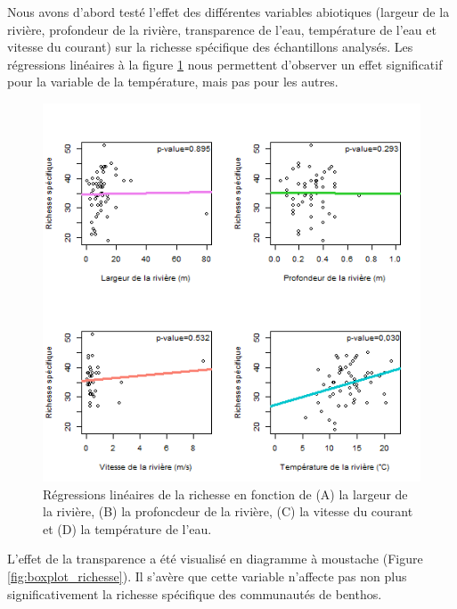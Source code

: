 \documentclass[9pt,twocolumn,twoside,]{pnas-new}
\begin{document}
Nous avons d'abord testé l'effet des différentes variables abiotiques
(largeur de la rivière, profondeur de la rivière, transparence de l'eau,
température de l'eau et vitesse du courant) sur la richesse spécifique
des échantillons analysés. Les régressions linéaires à la figure
\ref{fig:regression_richesse} nous permettent d'observer un effet
significatif pour la variable de la température, mais pas pour les
autres.

\begin{figure}
\centering
\includegraphics{regression_richesse.png}
\caption{Régressions linéaires de la richesse en fonction de (A) la
largeur de la rivière, (B) la profoncdeur de la rivière, (C) la vitesse
du courant et (D) la température de l'eau.
\label{fig:regression_richesse}}
\end{figure}

L'effet de la transparence a été visualisé en diagramme à moustache
(Figure \ref{fig:boxplot_richesse}). Il s'avère que cette variable
n'affecte pas non plus significativement la richesse spécifique des
communautés de benthos.
\end{document}
